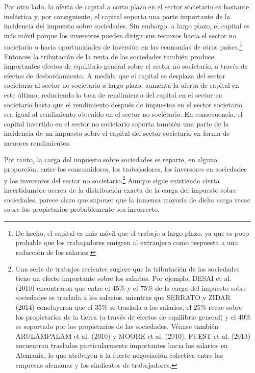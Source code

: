 \documentclass[10pt,a4paper]{article}
\begin{document}
Por otro lado, la oferta de capital a corto plazo en el sector societario es bastante inelástica y, por consiguiente, el capital soporta una parte importante de la incidencia del impuesto sobre sociedades. Sin embargo, a largo plazo, el capital es más móvil porque los inversores pueden dirigir sus recursos hacia el sector no societario o hacia oportunidades de inversión en las economías de otros países.\footnote{%
    De hecho, el capital es más móvil que el trabajo a largo plazo, ya que es poco probable que los trabajadores emigren al extranjero como respuesta a una reducción de los salarios.
} Entonces la tributación de la renta de las sociedades también produce importantes efectos de equilibrio general sobre el sector no societario, a través de efectos de desbordamiento. A medida que el capital se desplaza del sector societario al sector no societario a largo plazo, aumenta la oferta de capital en este último, reduciendo la tasa de rendimiento del capital en el sector no societario hasta que el rendimiento después de impuestos en el sector societario sea igual al rendimiento obtenido en el sector no societario. En consecuencia, el capital invertido en el sector no societario soporta también una parte de la incidencia de un impuesto sobre el capital del sector societario en forma de menores rendimientos. 

Por tanto, la carga del impuesto sobre sociedades se reparte, en alguna proporción, entre los consumidores, los trabajadores, los inversores en sociedades y los inversores del sector no societario.\footnote{%
    Una serie de trabajos recientes sugiere que la tributación de las sociedades tiene un efecto importante sobre los salarios. Por ejemplo, DESAI et al. (2010) encontraron que entre el $45\%$ y el $75\%$ de la carga del impuesto sobre sociedades se traslada a los salarios, mientras que SERRATO y ZIDAR (2014) concluyeron que el $35\%$ se traslada a los salarios, el $25\%$ recae sobre los propietarios de la tierra (a través de efectos de equilibrio general) y el $40\%$ es soportado por los propietarios de las sociedades. Véanse también ARULAMPALAM et al. (2010) y MOORE et al. (2010). FUEST et al. (2013) encuentran traslados particularmente importantes hacia los salarios en Alemania, lo que atribuyen a la fuerte negociación colectiva entre las empresas alemanas y los sindicatos de trabajadores.
} Aunque sigue existiendo cierta incertidumbre acerca de la distribución exacta de la carga del impuesto sobre sociedades, parece claro que suponer que la inmensa mayoría de dicha carga recae sobre los propietarios probablemente sea incorrecto.
\end{document}
